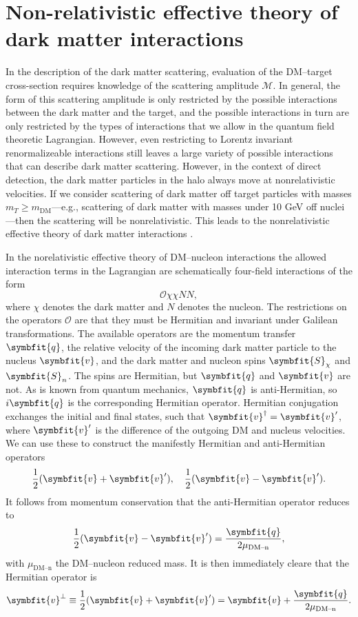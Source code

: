 \documentclass[b5paper, 10pt, twoside]{book}
\renewcommand{\vec}[1]{\symbfit{#1}}
\begin{document}
\chapter{Non-relativistic effective theory of dark matter interactions}
\label{chap:eft}

In the description of the dark matter scattering, evaluation of the DM--target cross-section requires knowledge of the scattering amplitude $\mathcal{M}$. In general, the form of this scattering amplitude is only restricted by the possible interactions between the dark matter and the target, and the possible interactions in turn are only restricted by the types of interactions that we allow in the quantum field theoretic Lagrangian. However, even restricting to Lorentz invariant renormalizeable interactions still leaves a large variety of possible interactions that can describe dark matter scattering. However, in the context of direct detection, the dark matter particles in the halo always move at nonrelativistic velocities. If we consider scattering of dark matter off target particles with masses $m_T\geq m_\text{DM}$---e.g., scattering of dark matter with masses under 10 GeV off nuclei---then the scattering will be nonrelativistic. This leads to the nonrelativistic effective theory of dark matter interactions \parencite{FitzpatrickEtAl2013}.

In the norelativistic effective theory of DM--nucleon interactions the allowed interaction terms in the Lagrangian are schematically four-field interactions of the form
\begin{equation}
\mathcal{O}\chi\chi NN,
\end{equation}
where $\chi$ denotes the dark matter and $N$ denotes the nucleon. The restrictions on the operators $\mathcal{O}$ are that they must be Hermitian and invariant under Galilean transformations. The available operators are the momentum transfer $\vec{q}$, the relative velocity of the incoming dark matter particle to the nucleus $\vec{v}$, and the dark matter and nucleon spins $\vec{S}_\chi$ and $\vec{S}_n$. The spins are Hermitian, but $\vec{q}$ and $\vec{v}$ are not. As is known from quantum mechanics, $\vec{q}$ is anti-Hermitian, so $i\vec{q}$ is the corresponding Hermitian operator. Hermitian conjugation exchanges the initial and final states, such that $\vec{v}^\dagger=\vec{v}'$, where $\vec{v}'$ is the difference of the outgoing DM and nucleus velocities. We can use these to construct the manifestly Hermitian and anti-Hermitian operators
\begin{equation}
\frac{1}{2}(\vec{v}+\vec{v}'),\quad\frac{1}{2}(\vec{v}-\vec{v}').
\end{equation}
It follows from momentum conservation that the anti-Hermitian operator reduces to
\begin{equation}
\frac{1}{2}(\vec{v}-\vec{v}')=\frac{\vec{q}}{2\mu_\text{DM--n}},
\end{equation}
with $\mu_\text{DM--n}$ the DM--nucleon reduced mass. It is then immediately cleare that the Hermitian operator is
\begin{equation}
\vec{v}^\perp\equiv\frac{1}{2}(\vec{v}+\vec{v}')=\vec{v}+\frac{\vec{q}}{2\mu_\text{DM--n}}.
\end{equation}
\end{document}
